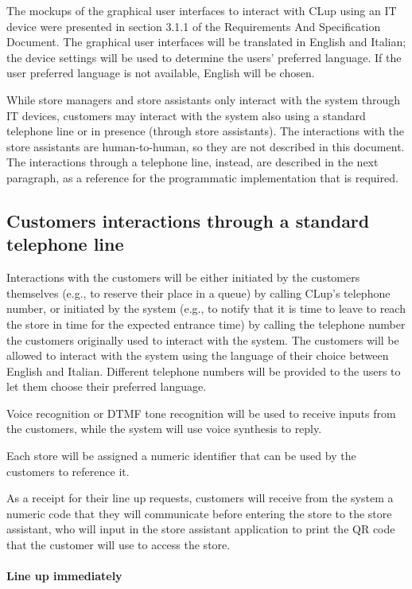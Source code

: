 \documentclass[../../main.tex]{subfiles}
\begin{document}
The mockups of the graphical user interfaces to interact with CLup using an IT
device were presented in section 3.1.1 of the Requirements And Specification
Document. The graphical user interfaces will be translated in English and
Italian; the device settings will be used to determine the users' preferred
language. If the user preferred language is not available, English will be
chosen.

While store managers and store assistants only interact with the system through
IT devices, customers may interact with the system also using a standard
telephone line or in presence (through store assistants). The interactions with
the store assistants are human-to-human, so they are not described in this
document. The interactions through a telephone line, instead, are described in
the next paragraph, as a reference for the programmatic implementation that is
required.

\subsection{Customers interactions through a standard telephone line}

Interactions with the customers will be either initiated by the customers
themselves (e.g., to reserve their place in a queue) by calling CLup's telephone
number, or initiated by the system (e.g., to notify that it is time to leave to
reach the store in time for the expected entrance time) by calling the telephone
number the customers originally used to interact with the system. The customers
will be allowed to interact with the system using the language of their choice
between English and Italian. Different telephone numbers will be provided to the
users to let them choose their preferred language.

Voice recognition or DTMF tone recognition will be used to receive inputs from
the customers, while the system will use voice synthesis to reply.

Each store will be assigned a numeric identifier that can be used by the
customers to reference it.

As a receipt for their line up requests, customers will receive from the system
a numeric code that they will communicate before entering the store to the store
assistant, who will input in the store assistant application to print the QR
code that the customer will use to access the store.

\paragraph{Line up immediately}
\end{document}
